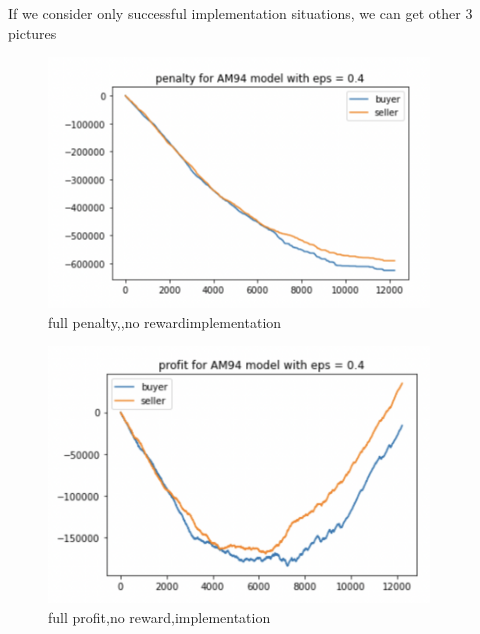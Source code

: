 \documentclass[11pt]{article}
\begin{document}
If we consider only successful implementation situations, we can get other 3 pictures

\begin{figure}[H]
	\begin{center}
	\includegraphics[width=0.9\textwidth]{28.PNG}
	\end{center}
	\caption{full penalty,,no rewardimplementation}
	\label{FIG.28}
\end{figure}

\begin{figure}[H]
	\begin{center}
	\includegraphics[width=0.9\textwidth]{29.PNG}
	\end{center}
	\caption{full profit,no reward,implementation}
	\label{FIG.29}
\end{figure}
\end{document}
